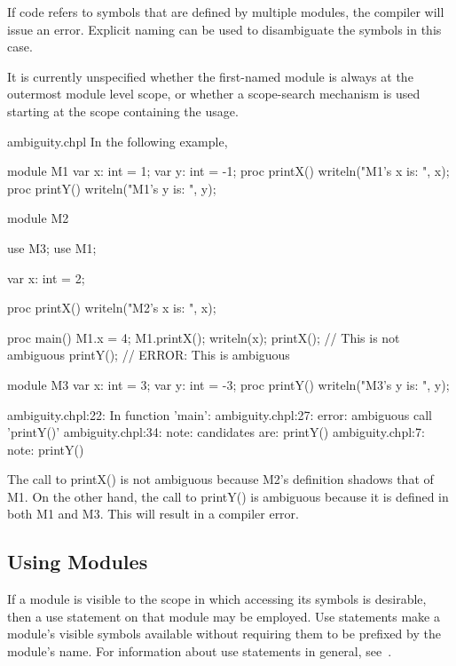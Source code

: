 If code refers to symbols that are defined by multiple modules, the
compiler will issue an error.  Explicit naming can be used to
disambiguate the symbols in this case.

\begin{openissue}
It is currently unspecified whether the
first-named module is always at the outermost module level scope, or whether a
scope-search mechanism is used starting at the scope containing the
usage.
\end{openissue}

\begin{chapelexample}{ambiguity.chpl}
In the following example,
\begin{chapel}
module M1 {
  var x: int = 1;
  var y: int = -1;
  proc printX() {
    writeln("M1's x is: ", x);
  }
  proc printY() {
    writeln("M1's y is: ", y);
  }
}
 
module M2 {
  use M3;
  use M1;

  var x: int = 2;

  proc printX() {
    writeln("M2's x is: ", x);
  }

  proc main() {
    M1.x = 4;
    M1.printX();
    writeln(x);
    printX(); // This is not ambiguous
    printY(); // ERROR: This is ambiguous
  }
}

module M3 {
  var x: int = 3;
  var y: int = -3;
  proc printY() {
    writeln("M3's y is: ", y);
  }
}
\end{chapel}
\begin{chapeloutput}
ambiguity.chpl:22: In function 'main':
ambiguity.chpl:27: error: ambiguous call 'printY()'
ambiguity.chpl:34: note: candidates are: printY()
ambiguity.chpl:7: note:                 printY()
\end{chapeloutput}
The call to printX() is not ambiguous because M2's definition shadows
that of M1.  On the other hand, the call to printY() is ambiguous
because it is defined in both M1 and M3.  This will result in a
compiler error.
\end{chapelexample}

\subsection{Using Modules}
\label{Using_Modules}

If a module is visible to the scope in which accessing its symbols is desirable,
then a use statement on that module may be employed.  Use statements
make a module's visible symbols available without requiring them to be
prefixed by the module's name.  For information about use statements in general,
see~.


